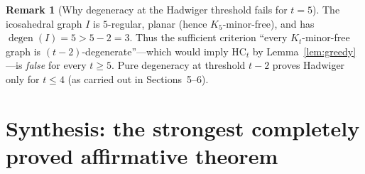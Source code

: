 \documentclass[11pt]{article}
\theoremstyle{definition}
\newtheorem{remark}[theorem]{Remark}
\newcommand{\degen}{\operatorname{degen}}
\begin{document}
\begin{remark}[Why degeneracy at the Hadwiger threshold fails for \(t=5\)]
The icosahedral graph \(I\) is \(5\)-regular, planar (hence \(K_5\)-minor-free),
and has \(\degen(I)=5>5-2=3\). Thus the sufficient criterion
``every \(K_t\)-minor-free graph is \((t-2)\)-degenerate''---which would imply
\(\mathrm{HC}_t\) by Lemma~\ref{lem:greedy}---is \emph{false} for every
\(t\ge 5\). Pure degeneracy at threshold \(t-2\) proves Hadwiger only for
\(t\le 4\) (as carried out in Sections~5--6).
\end{remark}

\section{Synthesis: the strongest completely proved affirmative theorem}
\end{document}
